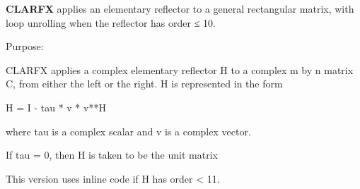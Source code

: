 {\bfseries C\+L\+A\+R\+F\+X} applies an elementary reflector to a general rectangular matrix, with loop unrolling when the reflector has order ≤ 10. 

 \begin{DoxyParagraph}{Purpose\+: }
\begin{DoxyVerb} CLARFX applies a complex elementary reflector H to a complex m by n
 matrix C, from either the left or the right. H is represented in the
 form

       H = I - tau * v * v**H

 where tau is a complex scalar and v is a complex vector.

 If tau = 0, then H is taken to be the unit matrix

 This version uses inline code if H has order < 11.\end{DoxyVerb}
 
\end{DoxyParagraph}

